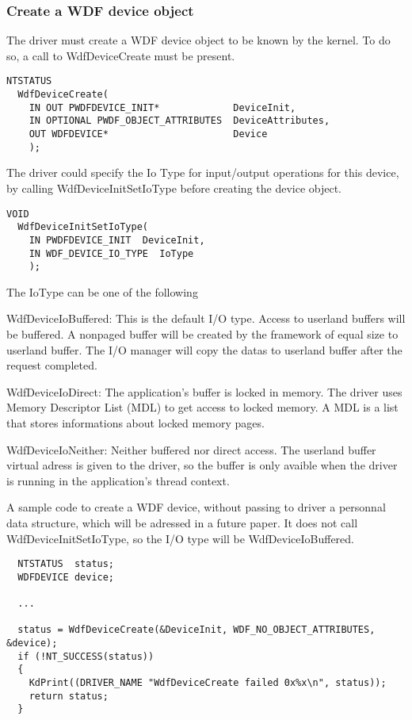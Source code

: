 \documentclass[11pt]{report}
\begin{document}
     \subsubsection{Create a WDF device object}
The driver must create a WDF device object to be 
known by the kernel.
To do so, a call to WdfDeviceCreate must be present.
\begin{lstlisting}
NTSTATUS
  WdfDeviceCreate(
    IN OUT PWDFDEVICE_INIT*             DeviceInit,
    IN OPTIONAL PWDF_OBJECT_ATTRIBUTES  DeviceAttributes,
    OUT WDFDEVICE*                      Device
    );
\end{lstlisting}
The driver could specify the Io Type for input/output operations
for this device, by calling WdfDeviceInitSetIoType before creating
the device object.
\begin{lstlisting}
VOID
  WdfDeviceInitSetIoType(
    IN PWDFDEVICE_INIT  DeviceInit,
    IN WDF_DEVICE_IO_TYPE  IoType
    );
\end{lstlisting}
The IoType can be one of the following
\begin{description}
        \item{WdfDeviceIoBuffered:}
          This is the default I/O type.
          Access to userland buffers will be buffered.
          A nonpaged buffer will be created by the framework of equal size to
          userland buffer. The I/O manager will copy the datas to userland
          buffer after the request completed.
        \item{WdfDeviceIoDirect:}
          The application's buffer is locked in memory.
          The driver uses Memory Descriptor List (MDL) to get access to locked memory.
          A MDL is a list that stores informations about locked memory pages.
        \item{WdfDeviceIoNeither:}
          Neither buffered nor direct access.
          The userland buffer virtual adress is given to the driver, so the buffer
          is only avaible when the driver is running in the application's thread context.
\end{description}

A sample code to create a WDF device, without passing to driver a personnal
data structure, which will be adressed in a future paper.
It does not call WdfDeviceInitSetIoType, so the I/O type will be WdfDeviceIoBuffered.
\begin{lstlisting}
  NTSTATUS  status;
  WDFDEVICE device;

  ...

  status = WdfDeviceCreate(&DeviceInit, WDF_NO_OBJECT_ATTRIBUTES, &device);
  if (!NT_SUCCESS(status))
  {
    KdPrint((DRIVER_NAME "WdfDeviceCreate failed 0x%x\n", status));
    return status;
  }
\end{lstlisting}
\end{document}
